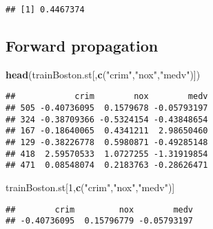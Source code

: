 \documentclass[
]{book}
\newenvironment{Shaded}{\begin{snugshade}}{\end{snugshade}}
\newcommand{\DecValTok}[1]{\textcolor[rgb]{0.00,0.00,0.81}{#1}}
\newcommand{\KeywordTok}[1]{\textcolor[rgb]{0.13,0.29,0.53}{\textbf{#1}}}
\newcommand{\NormalTok}[1]{#1}
\newcommand{\OperatorTok}[1]{\textcolor[rgb]{0.81,0.36,0.00}{\textbf{#1}}}
\newcommand{\StringTok}[1]{\textcolor[rgb]{0.31,0.60,0.02}{#1}}
\begin{document}
\begin{verbatim}
## [1] 0.4467374
\end{verbatim}

\hypertarget{forward-propagation}{%
\subsection{Forward propagation}\label{forward-propagation}}

\begin{Shaded}
\begin{Highlighting}[]
\KeywordTok{head}\NormalTok{(trainBoston.st[,}\KeywordTok{c}\NormalTok{(}\StringTok{"crim"}\NormalTok{,}\StringTok{"nox"}\NormalTok{,}\StringTok{"medv"}\NormalTok{)])}
\end{Highlighting}
\end{Shaded}

\begin{verbatim}
##            crim        nox        medv
## 505 -0.40736095  0.1579678 -0.05793197
## 324 -0.38709366 -0.5324154 -0.43848654
## 167 -0.18640065  0.4341211  2.98650460
## 129 -0.38226778  0.5980871 -0.49285148
## 418  2.59570533  1.0727255 -1.31919854
## 471  0.08548074  0.2183763 -0.28626471
\end{verbatim}

\begin{Shaded}
\begin{Highlighting}[]
\NormalTok{trainBoston.st[}\DecValTok{1}\NormalTok{,}\KeywordTok{c}\NormalTok{(}\StringTok{"crim"}\NormalTok{,}\StringTok{"nox"}\NormalTok{,}\StringTok{"medv"}\NormalTok{)]}
\end{Highlighting}
\end{Shaded}

\begin{verbatim}
##        crim         nox        medv 
## -0.40736095  0.15796779 -0.05793197
\end{verbatim}

\begin{Shaded}
\end{Shaded}
\end{document}
